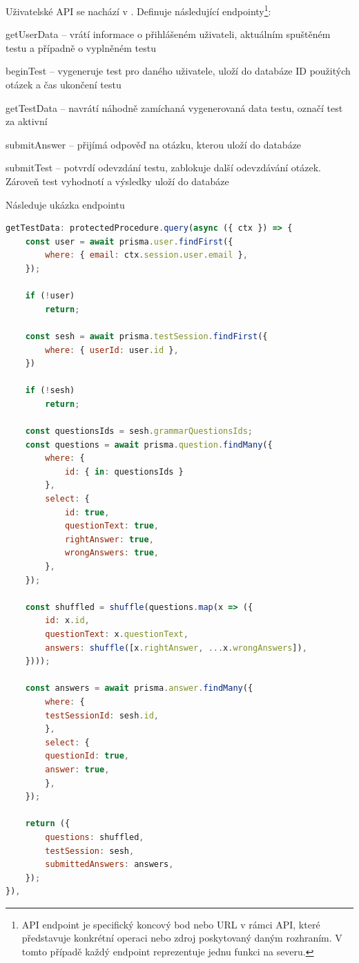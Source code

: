 Uživatelské API se nachází v . Definuje následující endpointy\footnote{API endpoint je specifický koncový bod nebo URL v rámci API, které představuje konkrétní operaci nebo zdroj poskytovaný daným rozhraním. V tomto případě každý endpoint reprezentuje jednu funkci na severu.}:

\begin{compactitem}
    \item getUserData -- vrátí informace o přihlášeném uživateli, aktuálním spuštěném testu a případně o vyplněném testu
    \item beginTest -- vygeneruje test pro daného uživatele, uloží do databáze ID použitých otázek a čas ukončení testu 
    \item getTestData -- navrátí náhodně zamíchaná vygenerovaná data testu, označí test za aktivní
    \item submitAnswer -- přijímá odpověď na otázku, kterou uloží do databáze
    \item submitTest -- potvrdí odevzdání testu, zablokuje další odevzdávání otázek. Zároveň test vyhodnotí a výsledky uloží do databáze
\end{compactitem}

Následuje ukázka endpointu 

\begin{lstlisting}[language=JavaScript,caption={Endpoint getTestData}]
getTestData: protectedProcedure.query(async ({ ctx }) => {
    const user = await prisma.user.findFirst({ 
        where: { email: ctx.session.user.email },
    });

    if (!user)
        return;

    const sesh = await prisma.testSession.findFirst({
        where: { userId: user.id },
    })

    if (!sesh)
        return;

    const questionsIds = sesh.grammarQuestionsIds;
    const questions = await prisma.question.findMany({
        where: {
            id: { in: questionsIds }
        },
        select: {
            id: true,
            questionText: true,
            rightAnswer: true,
            wrongAnswers: true,
        },
    });

    const shuffled = shuffle(questions.map(x => ({
        id: x.id,
        questionText: x.questionText,
        answers: shuffle([x.rightAnswer, ...x.wrongAnswers]),
    })));

    const answers = await prisma.answer.findMany({
        where: {
        testSessionId: sesh.id,
        },
        select: {
        questionId: true,
        answer: true,
        },
    });

    return ({
        questions: shuffled,
        testSession: sesh,
        submittedAnswers: answers,
    });
}),
\end{lstlisting}

